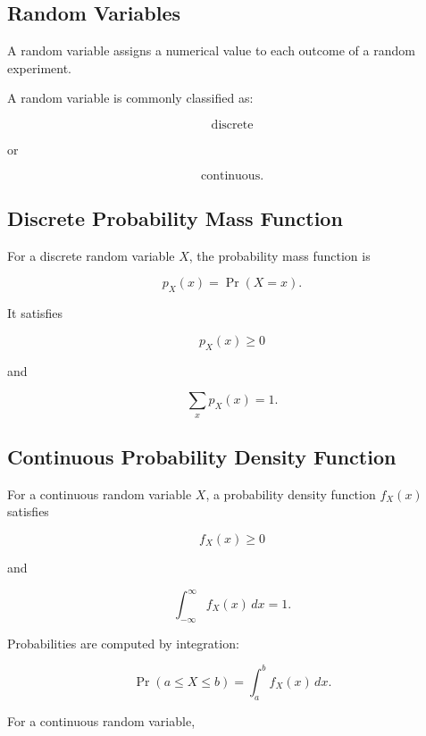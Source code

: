\subsection{Random Variables}
\label{subsec:random-variable-reference}

A random variable assigns a numerical value to each outcome of a random
experiment.

A random variable is commonly classified as:

\[
\boxed{
\text{discrete}
}
\]

or

\[
\boxed{
\text{continuous}.
}
\]

\subsection{Discrete Probability Mass Function}
\label{subsec:pmf-reference}

For a discrete random variable \(X\), the probability mass function is

\[
\boxed{
p_X(x)
=
\Pr(X=x).
}
\]

It satisfies

\[
\boxed{
p_X(x)\geq0
}
\]

and

\[
\boxed{
\sum_x p_X(x)=1.
}
\]

\subsection{Continuous Probability Density Function}
\label{subsec:pdf-reference}

For a continuous random variable \(X\), a probability density function
\(f_X(x)\) satisfies

\[
\boxed{
f_X(x)\geq0
}
\]

and

\[
\boxed{
\int_{-\infty}^{\infty}
f_X(x)\,dx
=
1.
}
\]

Probabilities are computed by integration:

\[
\boxed{
\Pr(a\leq X\leq b)
=
\int_a^b
f_X(x)\,dx.
}
\]

For a continuous random variable,

